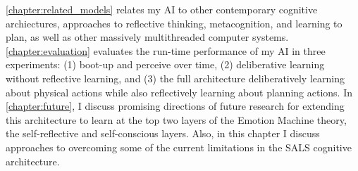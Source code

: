 {\mbox{\autoref{chapter:related_models}}} relates my AI to other
contemporary cognitive archiectures, approaches to reflective
thinking, metacognition, and learning to plan, as well as other
massively multithreaded computer systems.
{\mbox{\autoref{chapter:evaluation}}} evaluates the run-time
performance of my AI in three experiments: (1) boot-up and perceive
over time, (2) deliberative learning without reflective learning, and
(3) the full architecture deliberatively learning about physical
actions while also reflectively learning about planning actions.  In
{\mbox{\autoref{chapter:future}}}, I discuss promising directions of
future research for extending this architecture to learn at the top
two layers of the Emotion Machine theory, the self-reflective and
self-conscious layers.  Also, in this chapter I discuss approaches to
overcoming some of the current limitations in the SALS cognitive
architecture.


